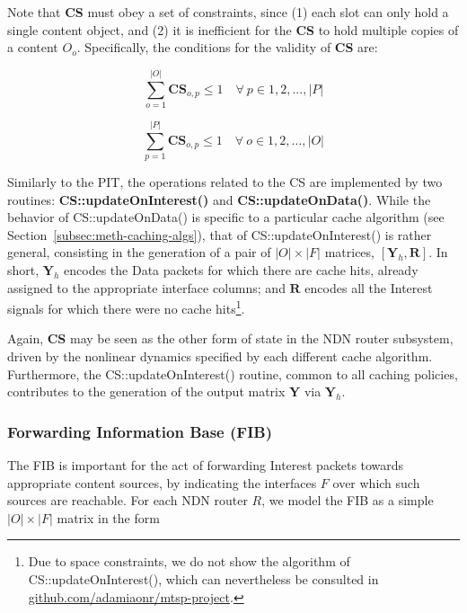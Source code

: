 Note that \textbf{CS} must obey a set of constraints, since (1) 
each slot can only hold a single content object, and (2) it is inefficient for 
the \textbf{CS} to hold multiple copies of a content $O_o$. Specifically, the 
conditions for the validity of \textbf{CS} are:

\begin{equation}
    \sum_{o=1}^{|O|} \textbf{CS}_{o,p} \le 1 \quad \forall \ p \in {1, 2, ..., |P|}
    \label{eq:cs-constraints-1}
\end{equation}

\begin{equation}
    \sum_{p=1}^{|P|} \textbf{CS}_{o,p} \le 1 \quad \forall \ o \in {1, 2, ..., |O|}
    \label{eq:cs-constraints-2}
\end{equation}

Similarly to the PIT, the operations related to the CS are implemented by two 
routines: \textbf{CS::updateOnInterest()} and \textbf{CS::updateOnData()}. While 
the behavior of CS::updateOnData() is specific to a particular cache 
algorithm (see Section~\ref{subsec:meth-caching-algs}), that of CS::updateOnInterest() 
is rather general, consisting in the generation of a pair of $|O| \times |F|$ 
matrices, $[\textbf{Y}_h, \textbf{R}]$. In short, $\textbf{Y}_h$ encodes 
the Data packets for which there are cache hits, already assigned to the 
appropriate interface columns; and $\textbf{R}$ encodes all the Interest signals 
for which there were no cache hits\footnote{Due to space constraints, we do not 
show the algorithm of CS::updateOnInterest(), which can nevertheless be 
consulted in \url{github.com/adamiaonr/mtsp-project}.}.\shortvertbreak

Again, \textbf{CS} may be seen as the other form of state in the NDN router 
subsystem, driven by the nonlinear dynamics specified by each different 
cache algorithm. Furthermore, the CS::updateOnInterest() 
routine, common to all caching policies, contributes to the generation of the 
output matrix \textbf{Y} via $\textbf{Y}_h$.\shortvertbreak

\subsubsection{Forwarding Information Base (FIB)}
\label{subsec:meth-fib}

The FIB is important for the act of forwarding Interest packets towards 
appropriate content sources, by indicating the interfaces $F$ over which such 
sources are reachable. For each NDN router $R$, we model the FIB as a simple 
$|O| \times |F|$ matrix in the form

